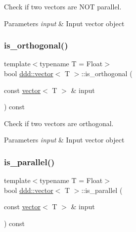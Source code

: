 Check if two vectors are N\+OT parallel. 


\begin{DoxyParams}{Parameters}
{\em input} & Input vector object \\
\hline
\end{DoxyParams}
\mbox{\label{classddd_1_1vector_aa4093c63121a3787e4b43581f23c3e0a}} 
\subsubsection{\texorpdfstring{is\+\_\+orthogonal()}{is\_orthogonal()}}
{\footnotesize\ttfamily template$<$typename T = Float$>$ \\
bool \hyperlink{classddd_1_1vector}{ddd\+::vector}$<$ T $>$\+::is\+\_\+orthogonal (\begin{DoxyParamCaption}\item[{const \hyperlink{classddd_1_1vector}{vector}$<$ T $>$ \&}]{input }\end{DoxyParamCaption}) const\hspace{0.3cm}{\ttfamily [inline]}}



Check if two vectors are orthogonal. 


\begin{DoxyParams}{Parameters}
{\em input} & Input vector object \\
\hline
\end{DoxyParams}
\mbox{\label{classddd_1_1vector_ac3fc063a06940c9893579b1f53f1dda0}} 
\subsubsection{\texorpdfstring{is\+\_\+parallel()}{is\_parallel()}}
{\footnotesize\ttfamily template$<$typename T = Float$>$ \\
bool \hyperlink{classddd_1_1vector}{ddd\+::vector}$<$ T $>$\+::is\+\_\+parallel (\begin{DoxyParamCaption}\item[{const \hyperlink{classddd_1_1vector}{vector}$<$ T $>$ \&}]{input }\end{DoxyParamCaption}) const\hspace{0.3cm}{\ttfamily [inline]}}



